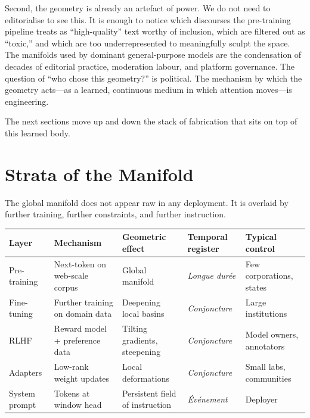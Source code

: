 \documentclass[12pt,a4paper]{article}
\begin{document}
Second, the geometry is already an artefact of power. We do not need to editorialise to see this. It is enough to notice which discourses the pre-training pipeline treats as ``high-quality'' text worthy of inclusion, which are filtered out as ``toxic,'' and which are too underrepresented to meaningfully sculpt the space. The manifolds used by dominant general-purpose models are the condensation of decades of editorial practice, moderation labour, and platform governance. The question of ``who chose this geometry?'' is political. The mechanism by which the geometry acts---as a learned, continuous medium in which attention moves---is engineering.

The next sections move up and down the stack of fabrication that sits on top of this learned body.

\section{Strata of the Manifold}

The global manifold does not appear raw in any deployment. It is overlaid by further training, further constraints, and further instruction.

\begin{formalbox}[title={Strata of the manifold}]
\begin{tabular}{@{}lllll@{}}
\toprule
\textbf{Layer} & \textbf{Mechanism} & \textbf{Geometric effect} & \textbf{Temporal register} & \textbf{Typical control} \\
\midrule
Pre-training   & Next-token on web-scale corpus & Global manifold                & \emph{Longue dur\'{e}e} & Few corporations, states \\
Fine-tuning    & Further training on domain data& Deepening local basins         & \emph{Conjoncture}      & Large institutions        \\
RLHF           & Reward model + preference data & Tilting gradients, steepening  & \emph{Conjoncture}      & Model owners, annotators  \\
Adapters       & Low-rank weight updates        & Local deformations             & \emph{Conjoncture}      & Small labs, communities   \\
System prompt  & Tokens at window head          & Persistent field of instruction& \emph{\'{E}v\'{e}nement} & Deployer                  \\
\bottomrule
\end{tabular}
\end{formalbox}
\end{document}

